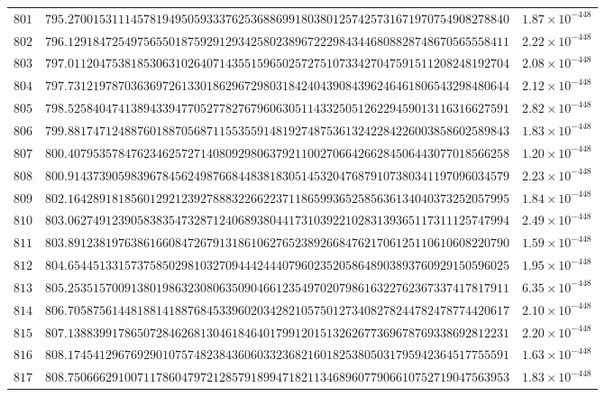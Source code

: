 \documentclass[12pt,reqno]{amsart}
\theoremstyle{remark}
\begin{document}
\begin{longtable}{clc}
$801$ & $795.2700153111457819495059333762536886991803801257425731671970754908278840$ & $1.87\times 10^{-448}$ \\
$802$ & $796.1291847254975655018759291293425802389672229843446808828748670565558411$ & $2.22\times 10^{-448}$ \\
$803$ & $797.0112047538185306310264071435515965025727510733427047591511208248192704$ & $2.08\times 10^{-448}$ \\
$804$ & $797.7312197870363697261330186296729803184240439084396246461806543298480644$ & $2.12\times 10^{-448}$ \\
$805$ & $798.5258404741389433947705277827679606305114332505126229459013116316627591$ & $2.82\times 10^{-448}$ \\
$806$ & $799.8817471248876018870568711553559148192748753613242284226003858602589843$ & $1.83\times 10^{-448}$ \\
$807$ & $800.4079535784762346257271408092980637921100270664266284506443077018566258$ & $1.20\times 10^{-448}$ \\
$808$ & $800.9143739059839678456249876684483818305145320476879107380341197096034579$ & $2.23\times 10^{-448}$ \\
$809$ & $802.1642891818560129212392788832266223711865993652585636134040373252057995$ & $1.84\times 10^{-448}$ \\
$810$ & $803.0627491239058383547328712406893804417310392210283139365117311125747994$ & $2.49\times 10^{-448}$ \\
$811$ & $803.8912381976386166084726791318610627652389266847621706125110610608220790$ & $1.59\times 10^{-448}$ \\
$812$ & $804.6544513315737585029810327094442444079602352058648903893760929150596025$ & $1.95\times 10^{-448}$ \\
$813$ & $805.2535157009138019863230806350904661235497020798616322762367337417817911$ & $6.35\times 10^{-448}$ \\
$814$ & $806.7058756144818814188768453396020342821057501273408278244782478774420617$ & $2.10\times 10^{-448}$ \\
$815$ & $807.1388399178650728462681304618464017991201513262677369678769338692812231$ & $2.20\times 10^{-448}$ \\
$816$ & $808.1745412967692901075748238436060332368216018253805031795942364517755591$ & $1.63\times 10^{-448}$ \\
$817$ & $808.7506662910071178604797212857918994718211346896077906610752719047563953$ & $1.83\times 10^{-448}$ \\

\end{longtable}
\end{document}
